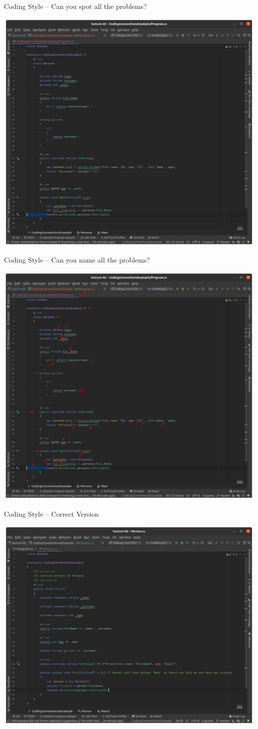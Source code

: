 \documentclass[presentation]{beamer}
\begin{document}
\begin{frame}{\csharp Coding Style -- Can you spot all the problems?}\centering

    \includegraphics[width=0.7\linewidth]{img/wrong-conventions.png}

\end{frame}

\begin{frame}{\csharp Coding Style -- Can you name all the problems? }\centering

    \includegraphics[width=0.7\linewidth]{img/wrong-conventions.pdf}

\end{frame}

\begin{frame}{\csharp Coding Style -- Correct Version }\centering

    \includegraphics[width=0.8\linewidth]{img/good-conventions.png}

\end{frame}
\end{document}
